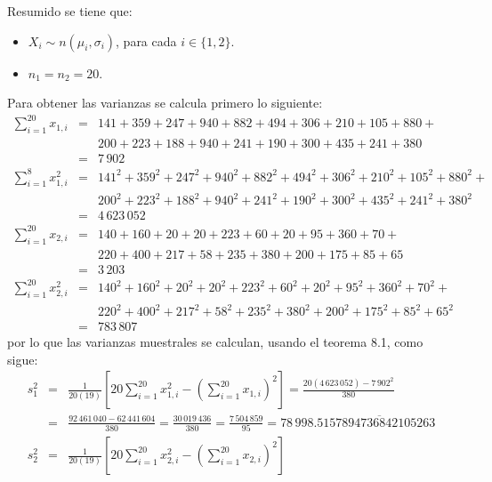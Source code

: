 \begin{solucion}
 \begin{datos}
  Resumido se tiene que:
  \begin{itemize}
   \item $X_i \sim n\left( \mu_i, \sigma_i \right)$, para cada $i \in \{1,2\}$.
   \item $n_1 = n_2 = 20$.
  \end{itemize}
  Para obtener las varianzas se calcula primero lo siguiente:
  \begin{eqnarray*}
   \sum_{i=1}^{20} x_{1,i} & = &
   141 + 359 + 247 + 940 + 882 + 494 + 306 + 210 + 105 + 880 + \\
   & & 200 + 223 + 188 + 940 + 241 + 190 + 300 + 435 + 241 + 380 \\
   & = & 7\,902 \\
   \sum_{i=1}^{8} x_{1,i}^2 & = & 
   141^2 + 359^2 + 247^2 + 940^2 + 882^2 + 
   494^2 + 306^2 + 210^2 + 105^2 + 880^2 + \\
   & & 200^2 + 223^2 + 188^2 + 940^2 + 241^2
   + 190^2 + 300^2 + 435^2 + 241^2 + 380^2 \\
   & = & 4\,623\,052
  \end{eqnarray*}
  \begin{eqnarray*}
   \sum_{i=1}^{20} x_{2,i} & = &
   140 + 160 + 20 + 20 + 223 + 60 + 20 + 95 + 360 + 70 + \\
   & & 220 + 400 + 217 + 58 + 235 + 380 + 200 + 175 + 85 + 65 \\
   & = & 3\,203 \\
   \sum_{i=1}^{20} x_{2,i}^2 & = &
   140^2 + 160^2 + 20^2 + 20^2 + 223^2 +
   60^2 + 20^2 + 95^2 + 360^2 + 70^2 + \\
   & & 220^2 + 400^2 + 217^2 + 58^2 + 235^2
   + 380^2 + 200^2 + 175^2 + 85^2 + 65^2 \\
   & = & 783\,807
  \end{eqnarray*}
  por lo que las varianzas muestrales se calculan, usando el teorema 8.1,
  como sigue:
  \begin{eqnarray*}
   s_1^2 & = &
   \frac{1}{20(19)}
   \left[ 20\sum_{i=1}^{20} x_{1,i}^2 -
   \left( \sum_{i=1}^{20} x_{1,i} \right)^2 \right]
   = \frac{20(4\,623\,052) - 7\,902^2}{380} \\
   & = & \frac{92\,461\,040 - 62\,441\,604}{380} = \frac{30\,019\,436}{380}
   = \frac{7\,504\,859}{95} = 78\,998.5\overline{157894736842105263} \\
   s_2^2 & = &
   \frac{1}{20(19)}
   \left[ 20\sum_{i=1}^{20} x_{2,i}^2 -
   \left( \sum_{i=1}^{20} x_{2,i} \right)^2 \right]

\end{eqnarray*}
\end{datos}
\end{solucion}
